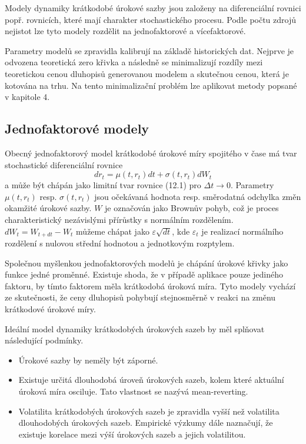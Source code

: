 \documentclass[a4paper]{book}
\begin{document}
Modely dynamiky krátkodobé úrokové sazby jsou založeny na diferenciální rovnici popř. rovnicích, které mají charakter stochastického procesu. Podle počtu zdrojů nejistot lze tyto modely rozdělit na jednofaktorové a vícefaktorové.

Parametry modelů se zpravidla kalibrují na základě historických dat. Nejprve je odvozena teoretická zero křivka a následně se minimalizují rozdíly mezi teoretickou cenou dluhopisů generovanou modelem a skutečnou cenou, která je kotována na trhu. Na tento minimalizační problém lze aplikovat metody popsané v kapitole 4.

\subsection{Jednofaktorové modely}

Obecný jednofaktorový model krátkodobé úrokové míry spojitého v čase má tvar stochastické diferenciální rovnice
\begin{equation}
d r_t = \mu(t, r_t) dt + \sigma(t, r_t) dW_t
\end{equation}
a může být chápán jako limitní tvar rovnice (12.1) pro $\Delta t \rightarrow 0$. Parametry $\mu(t, r_t)$ resp. $\sigma(t, r_t)$ jsou očekávaná hodnota resp. směrodatná odchylka změn okamžité úrokové sazby. $W$ je označován jako Brownův pohyb, což je proces charakteristický nezávislými přírůstky s normálním rozdělením. $dW_t = W_{t + dt} - W_t$ můžeme chápat jako $\varepsilon \sqrt{d t}$, kde $\varepsilon_t$ je realizací normálního rozdělení s nulovou střední hodnotou a jednotkovým rozptylem.

Společnou myšlenkou jednofaktorových modelů je chápání úrokové křivky jako funkce jedné proměnné. Existuje shoda, že v případě aplikace pouze jediného faktoru, by tímto faktorem měla krátkodobá úroková míra. Tyto modely vychází ze skutečnosti, že ceny dluhopisů pohybují stejnosměrně v reakci na změnu krátkodové úrokové míry.

Ideální model dynamiky krátkodobých úrokových sazeb by měl splňovat následující podmínky.
\begin{itemize}
\item Úrokové sazby by neměly být záporné.
\item Existuje určitá dlouhodobá úroveň úrokových sazeb, kolem které aktuální úroková míra osciluje. Tato vlastnost se nazývá mean-reverting.
\item Volatilita krátkodobých úrokových sazeb je zpravidla vyšší než volatilita dlouhodobých úrokových sazeb. Empirické výzkumy dále naznačují, že existuje korelace mezi výší úrokových sazeb a jejich volatilitou.
\end{itemize}
\end{document}

